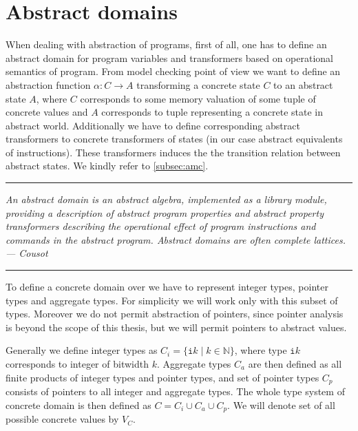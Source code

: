 
\section{Abstract domains} \label{sec:absdom}

When dealing with abstraction of programs, first of all, one has to define an
abstract domain for program variables and transformers based on operational
semantics of program. From model checking point of view we want to define an
abstraction function $\alpha \colon C \to A$ transforming a concrete
state $C$ to an abstract state $A$, where $C$ corresponds to some memory
valuation of some tuple of concrete values and $A$ corresponds to tuple
representing a concrete state in abstract world.  Additionally we have to define
corresponding abstract transformers to concrete transformers of states (in our
case abstract equivalents of \LLVM instructions). These transformers induces the
the transition relation between abstract states. We kindly refer to
\autoref{subsec:amc}.

\bigskip

\hrule

\bigskip
\noindent
\textit{An abstract domain is an abstract algebra, implemented as a library module,
providing a description of abstract program properties and abstract property
transformers describing the operational effect of program instructions and
commands in the abstract program. Abstract domains are often complete lattices. --- Cousot \cite{Cousot79} }
\bigskip

\hrule

\bigskip

To define a concrete domain over \LLVM we have to represent integer types,
pointer types and aggregate types. For simplicity we will work only with this
subset of \LLVM types. Moreover we do not permit abstraction of pointers, since
pointer analysis is beyond the scope of this thesis, but we will permit
pointers to abstract values.

Generally we define integer types as $C_{i} = \{ \texttt{i}k \mid k
\in \mathbb{N} \}$, where type $\texttt{i}k$ corresponds to integer of bitwidth $k$.
Aggregate types $C_a$ are then defined as all finite products of integer types and
pointer types, and set of pointer types $C_p$ consists of pointers to all integer
and aggregate types. The whole type system of concrete domain is
then defined as $C = C_i \cup C_a \cup C_p$. We will denote set of all possible
concrete values by $V_C$.

